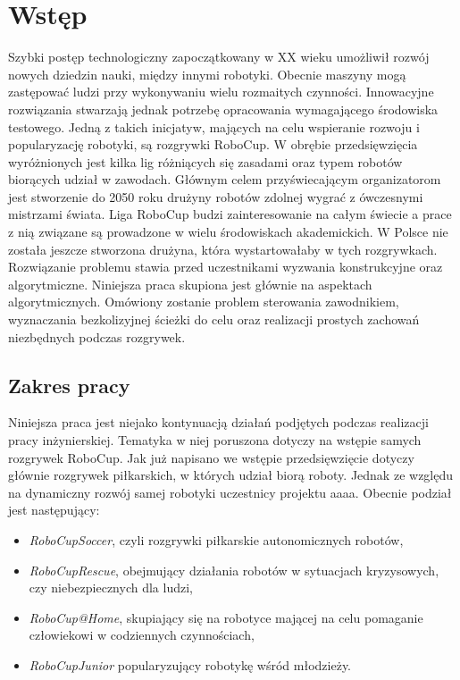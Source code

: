 \chapter[Wstęp ]{Wstęp}
Szybki postęp technologiczny zapoczątkowany w XX wieku umożliwił rozwój nowych dziedzin nauki, między innymi robotyki. Obecnie maszyny mogą zastępować ludzi przy wykonywaniu wielu rozmaitych czynności.
Innowacyjne rozwiązania stwarzają jednak potrzebę opracowania wymagającego środowiska testowego. Jedną z takich inicjatyw, mających na celu wspieranie rozwoju i popularyzację robotyki, są rozgrywki
RoboCup. W obrębie przedsięwzięcia wyróżnionych jest kilka lig różniących się zasadami oraz typem robotów biorących udział w zawodach.
Głównym celem przyświecającym organizatorom jest stworzenie do 2050 roku drużyny robotów zdolnej wygrać z ówczesnymi mistrzami świata.
Liga RoboCup budzi zainteresowanie na całym świecie a prace z nią związane  są prowadzone w wielu środowiskach akademickich.
W Polsce nie została jeszcze stworzona drużyna, która wystartowałaby w tych rozgrywkach.
Rozwiązanie problemu stawia przed uczestnikami wyzwania konstrukcyjne oraz algorytmiczne. Niniejsza praca skupiona jest głównie na aspektach algorytmicznych. Omówiony zostanie problem sterowania
zawodnikiem, wyznaczania bezkolizyjnej ścieżki do celu oraz realizacji prostych zachowań niezbędnych podczas rozgrywek.
\section{Zakres pracy}
Niniejsza praca jest niejako kontynuacją działań podjętych podczas realizacji pracy inżynierskiej. Tematyka w niej poruszona dotyczy na wstępie samych rozgrywek RoboCup. Jak już napisano we 
wstępie przedsięwzięcie dotyczy głównie rozgrywek piłkarskich, w których udział biorą roboty. Jednak ze względu na dynamiczny rozwój samej robotyki uczestnicy projektu aaaa.
Obecnie podział jest następujący:
\begin{itemize}
	\item \emph{RoboCupSoccer}, czyli rozgrywki piłkarskie autonomicznych robotów,
	\item \emph{RoboCupRescue}, obejmujący działania robotów w sytuacjach kryzysowych, czy niebezpiecznych dla ludzi,
	\item \emph{RoboCup@Home}, skupiający się na robotyce mającej na celu pomaganie człowiekowi w codziennych czynnościach,
	\item \emph{RoboCupJunior} popularyzujący robotykę wśród młodzieży.
\end{itemize}

